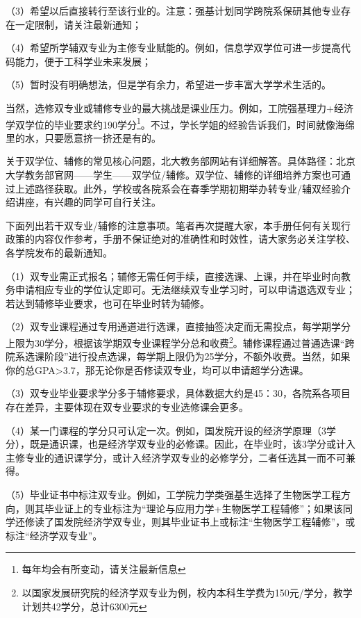 \documentclass[11pt,oneside]{book}
\begin{document}
（3）希望以后直接转行至该行业的。注意：强基计划同学跨院系保研其他专业存在一定限制，请关注最新通知；

（4）希望所学辅双专业为主修专业赋能的。例如，信息学双学位可进一步提高代码能力，便于工科学业未来发展；

（5）暂时没有明确想法，但是学有余力，希望进一步丰富大学学术生活的。

\vspace{10pt}

当然，选修双专业或辅修专业的最大挑战是课业压力。例如，工院强基理力+经济学双学位的毕业要求约190学分\footnote{每年均会有所变动，请关注最新信息}。不过，学长学姐的经验告诉我们，时间就像海绵里的水，只要愿意挤一挤还是有的。

关于双学位、辅修的常见核心问题，北大教务部网站有详细解答。具体路径：北京大学教务部官网——学生——双学位/辅修。双学位、辅修的详细培养方案也可通过上述路径获取。此外，学校或各院系会在春季学期初期举办转专业/辅双经验介绍讲座，有兴趣的同学可自行关注。

\vspace{10pt}

下面列出若干双专业/辅修的注意事项。笔者再次提醒大家，本手册任何有关现行政策的内容仅作参考，手册不保证绝对的准确性和时效性，请大家务必关注学校、各学院发布的最新通知。

（1）双专业需正式报名；辅修无需任何手续，直接选课、上课，并在毕业时向教务申请相应专业的学位认定即可。无法继续双专业学习时，可以申请退选双专业；若达到辅修毕业要求，也可在毕业时转为辅修。

（2）双专业课程通过专用通道进行选课，直接抽签决定而无需投点，每学期学分上限为30学分，根据该学期双专业课程学分总和收费\footnote{以国家发展研究院的经济学双专业为例，校内本科生学费为150元/学分，教学计划共42学分，总计6300元}。辅修课程通过普通选课“跨院系选课阶段”进行投点选课，每学期上限仍为25学分，不额外收费。当然，如果你的总GPA>3.7，那无论你是否修读双专业，均可以申请超学分选课。

（3）双专业毕业要求学分多于辅修要求，具体数据大约是45：30，各院系各项目存在差异，主要体现在双专业要求的专业选修课会更多。

（4）某一门课程的学分只可认定一次。例如，国发院开设的经济学原理（3学分），既是通识课，也是经济学双专业的必修课。因此，在毕业时，该3学分或计入主修专业的通识课学分，或计入经济学双专业的必修学分，二者任选其一而不可兼得。

（5）毕业证书中标注双专业。例如，工学院力学类强基生选择了生物医学工程方向，则其毕业证上的专业标注为“理论与应用力学+生物医学工程辅修”；如果该同学还修读了国发院经济学双专业，则其毕业证书上或标注“生物医学工程辅修”，或标注“经济学双专业”。
\end{document}
